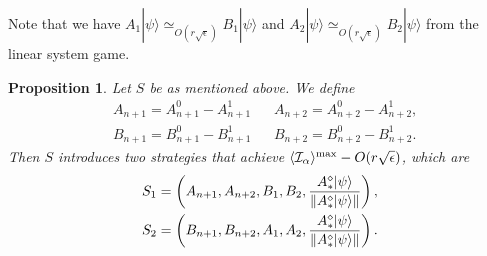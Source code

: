 \documentclass[11pt,letterpaper]{article}
\newcommand{\ket}[1]{|#1\rangle}
\DeclarePairedDelimiter{\norm}{\lVert}{\rVert}
\DeclarePairedDelimiter{\ip}{\langle}{\rangle}
\DeclareMathOperator{\spn}{span}
\DeclareMathOperator{\supp}{supp}
\newcommand{\1}{\mathbb{1}}
\newcommand{\I}{\mathcal{I}}
\newcommand{\se}{\sqrt{\epsilon}}
\newcommand{\appd}[1]{\simeq_{#1}}
\newtheorem{proposition}[theorem]{Proposition}
\theoremstyle{definition}
\begin{document}
Note that we have $A_1 \ket{\psi} \appd{O(r\se)} B_1 \ket{\psi}$ and $A_2 \ket{\psi} \appd{O(r\se)} B_2 \ket{\psi}$ from the linear
system game.


\begin{proposition}
	Let $S$ be as mentioned above. We define
	\begin{align}
		&A_{n+1} = A_{n+1}^0 - A_{n+1}^1 && A_{n+2} = A_{n+2}^0 - A_{n+2}^1,\\
		&B_{n+1} = B_{n+1}^0 - B_{n+1}^1 && B_{n+2} = B_{n+2}^0 - B_{n+2}^1.
	\end{align}
	Then $S$ introduces two strategies that achieve $\ip{\I_\alpha}^{\max} - O(r\se)$, which are
	\begin{align}
		S_1 = \left(A_{n+1}, A_{n+2}, B_1, B_2, \frac{A_\ast^\diamond\ket{\psi}}{\norm{A_\ast^\diamond\ket{\psi}}}\right),\\
		S_2 = \left(B_{n+1}, B_{n+2}, A_1, A_2, \frac{A_\ast^\diamond\ket{\psi}}{\norm{A_\ast^\diamond\ket{\psi}}}\right).
	\end{align}
\end{proposition}
\end{document}
